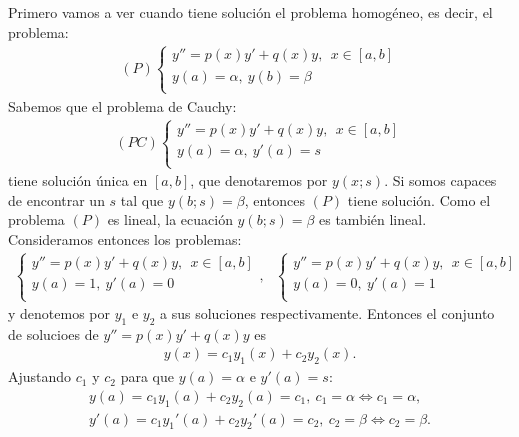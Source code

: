 Primero vamos a ver cuando tiene solución el problema homogéneo, es decir, el problema:
\begin{align*}
    (P)\left\{ \begin{array}{lcc}
                   y'' = p(x)y' + q(x)y, \ \ x \in [a,b] \\
                   y(a) = \alpha, \ y(b) = \beta         \\
               \end{array}
    \right.
\end{align*}
Sabemos que el problema de Cauchy:
\begin{align*}
    (PC)\left\{ \begin{array}{lcc}
                    y'' = p(x)y' + q(x)y, \ \ x \in [a,b] \\
                    y(a) = \alpha, \ y'(a) = s            \\
                \end{array}
    \right.
\end{align*}
tiene solución única en $[a,b]$, que denotaremos por $y(x;s)$. Si somos capaces de encontrar un $s$ tal que $y(b;s) = \beta$, entonces $(P)$ tiene solución. Como el problema $(P)$ es lineal, la ecuación $y(b;s) = \beta$ es también lineal. Consideramos entonces los problemas:
\begin{align*}
    \left\{ \begin{array}{lcc}
                y'' = p(x)y' + q(x)y, \ \ x \in [a,b] \\
                y(a) = 1, \ y'(a) = 0                 \\
            \end{array}
    \right., \ \ \ \left\{ \begin{array}{lcc}
                               y'' = p(x)y' + q(x)y, \ \ x \in [a,b] \\
                               y(a) = 0, \ y'(a) = 1                 \\
                           \end{array}
    \right.
\end{align*}
y denotemos por $y_1$ e $y_2$ a sus soluciones respectivamente. Entonces el conjunto de solucioes de $y'' = p(x)y' + q(x)y$ es
\begin{align*}
    y(x) = c_1y_1(x) + c_2y_2(x).
\end{align*}
Ajustando $c_1$ y $c_2$ para que $y(a) = \alpha$ e $y'(a) = s$:
\begin{align*}
    y(a) = c_1y_1(a) + c_2y_2(a) = c_1, \ c_1 = \alpha\Longleftrightarrow c_1 = \alpha , \\
    y'(a) = c_1y_1'(a) + c_2y_2'(a) = c_2,  \ c_2 = \beta\Longleftrightarrow c_2 = \beta .
\end{align*}
